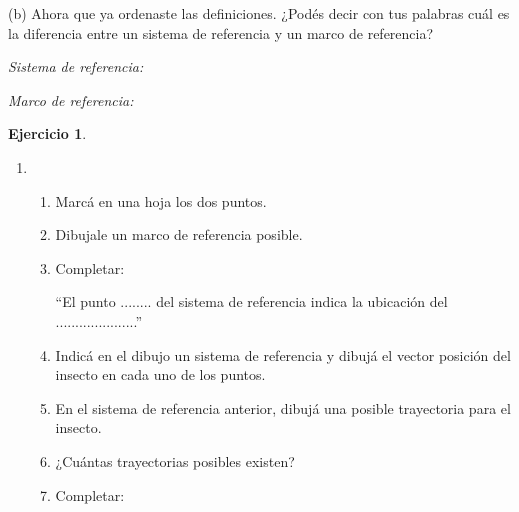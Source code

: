 \documentclass[a4paper,12pt,twoside]{book}
\newtheorem{ejercicio}{{Ejercicio}}[chapter]
\begin{document}
\begin{mdframed}[style=ejercicio-conceptual]
    (b) Ahora que ya ordenaste las definiciones. ¿Podés decir con tus palabras cuál es la diferencia entre un sistema de referencia y un marco de referencia?

    \vspace{1em}
    \emph{Sistema de referencia:}
    \vspace{4em}
    
    \emph{Marco de referencia:}
    \vspace{4em}
\end{mdframed}

\begin{mdframed}[style=ejercicio-conceptual]
    \begin{ejercicio}
    \end{ejercicio}

    \begin{enumerate}
        \item {}

        \begin{enumerate}
            \item Marcá en una hoja los dos puntos.
        
            \item Dibujale un marco de referencia posible.
            
            \item Completar:
            
            ``El punto ........ del sistema de referencia indica la ubicación del .....................''
            
            \item Indicá en el dibujo un sistema de referencia y dibujá el vector posición del insecto en cada uno de los puntos.
        
            \item En el sistema de referencia anterior, dibujá una posible trayectoria para el insecto.
            
            \item ¿Cuántas trayectorias posibles existen?
            
            \item Completar:
            

\end{enumerate}
\end{enumerate}
\end{mdframed}
\end{document}
